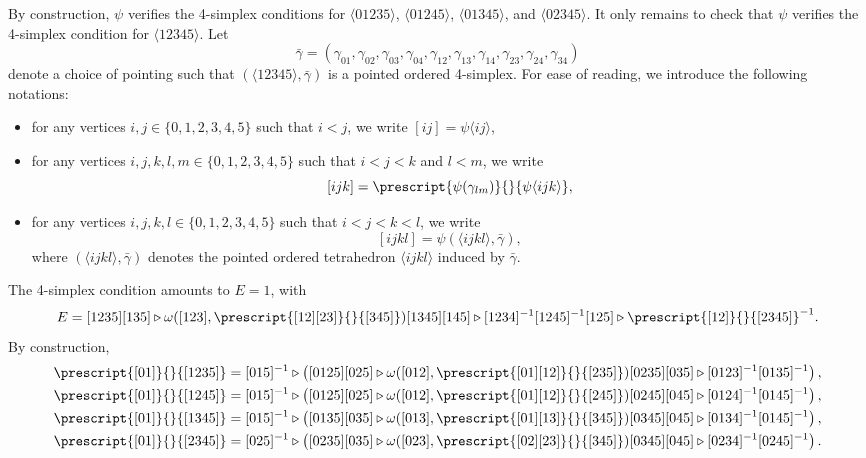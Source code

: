 \documentclass[a4paper, oneside]{amsart}
\numberwithin{equation}{subsection}
\theoremstyle{referencedlemma}
\theoremstyle{plain} %
\theoremstyle{remark}
\begin{document}
By construction, $\psi$ verifies the 4-simplex conditions for $\langle 01235\rangle$, $\langle 01245\rangle$, $\langle 01345\rangle$, and $\langle 02345\rangle$.  It only remains to check that $\psi$ verifies the 4-simplex condition for $\langle 12345\rangle$.  Let 
$$
\bar{\gamma} = (\gamma_{01}, \gamma_{02}, \gamma_{03}, \gamma_{04}, \gamma_{12}, \gamma_{13}, \gamma_{14}, \gamma_{23}, \gamma_{24}, \gamma_{34})
$$
denote a choice of pointing such that $(\langle 12345\rangle, \bar{\gamma})$ is a pointed ordered 4-simplex.  For ease of reading, we introduce the following notations:
\begin{itemize}
\item for any vertices $i,j \in \{0, 1, 2, 3, 4, 5\}$ such that $i< j$, we write $[ij] = \psi\langle ij\rangle$,
\item for any vertices $i,j,k, l, m\in \{0,1,2,3,4,5\}$ such that $i<j<k$ and $l<m$, we write $$[ijk] = \prescript{\psi(\gamma_{lm})}{}{\psi\langle ijk\rangle},$$
\item for any vertices $i,j,k,l\in \{0,1,2,3,4,5\}$ such that $i<j<k<l$, we write $$[ijkl] = \psi(\langle ijkl\rangle, \bar{\gamma}),$$ where $(\langle ijkl\rangle, \bar{\gamma})$ denotes the pointed ordered tetrahedron $\langle ijkl\rangle$ induced by $\bar{\gamma}$. 
\end{itemize}
The 4-simplex condition amounts to $E = 1$, with 
\begin{equation*}
E  = [1235] [135]\triangleright \omega([123], \prescript{[12][23]}{}{[345]})[1345][145]\triangleright [1234]^{-1}[1245]^{-1} [125]\triangleright \prescript{[12]}{}{[2345]}^{-1}.
\end{equation*}
By construction,
\begin{align*}
\prescript{[01]}{}{[1235]} &= [015]^{-1}\triangleright \left([0125][025]\triangleright \omega([012], \prescript{[01][12]}{}{[235]} )[0235][035]\triangleright [0123]^{-1}[0135]^{-1} \right),\\
\prescript{[01]}{}{[1245]} &= [015]^{-1}\triangleright \left([0125][025]\triangleright \omega([012], \prescript{[01][12]}{}{[245]} )[0245][045]\triangleright [0124]^{-1}[0145]^{-1}  \right),\\
\prescript{[01]}{}{[1345]} &= [015]^{-1}\triangleright \left([0135][035]\triangleright \omega([013], \prescript{[01][13]}{}{[345]} )[0345][045]\triangleright [0134]^{-1}[0145]^{-1}  \right),\\
\prescript{[01]}{}{[2345]} &= [025]^{-1}\triangleright \left([0235][035]\triangleright \omega([023], \prescript{[02][23]}{}{[345]} )[0345][045]\triangleright [0234]^{-1}[0245]^{-1}  \right).
\end{align*}
\end{document}
